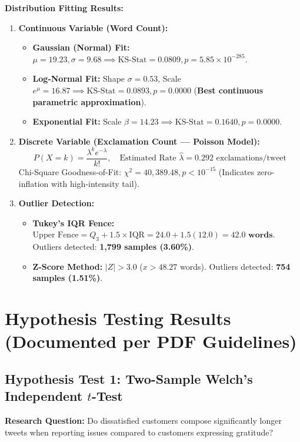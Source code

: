 \documentclass[11pt, a4paper]{article}
\begin{document}
\noindent \textbf{Distribution Fitting Results:}
\begin{enumerate}[leftmargin=1.5em]
    \item \textbf{Continuous Variable (Word Count):}
    \begin{itemize}
        \item \textbf{Gaussian (Normal) Fit:} $\mu = 19.23, \sigma = 9.68 \implies \text{KS-Stat} = 0.0809, p = 5.85 \times 10^{-285}$.
        \item \textbf{Log-Normal Fit:} Shape $\sigma = 0.53$, Scale $e^\mu = 16.87 \implies \text{KS-Stat} = \mathbf{0.0893}, p = 0.0000$ (\textbf{Best continuous parametric approximation}).
        \item \textbf{Exponential Fit:} Scale $\beta = 14.23 \implies \text{KS-Stat} = 0.1640, p = 0.0000$.
    \end{itemize}
    \item \textbf{Discrete Variable (Exclamation Count --- Poisson Model):}
    \begin{equation}
        P(X = k) = \frac{\lambda^k e^{-\lambda}}{k!}, \quad \text{Estimated Rate } \hat{\lambda} = 0.292 \text{ exclamations/tweet}
    \end{equation}
    Chi-Square Goodness-of-Fit: $\chi^2 = 40,389.48, p < 10^{-15}$ (Indicates zero-inflation with high-intensity tail).
    \item \textbf{Outlier Detection:}
    \begin{itemize}
        \item \textbf{Tukey's IQR Fence:} $\text{Upper Fence} = Q_3 + 1.5 \times \text{IQR} = 24.0 + 1.5(12.0) = \mathbf{42.0 \text{ words}}$. Outliers detected: \textbf{1,799 samples (3.60\%)}.
        \item \textbf{Z-Score Method:} $|Z| > 3.0$ ($x > 48.27$ words). Outliers detected: \textbf{754 samples (1.51\%)}.
    \end{itemize}
\end{enumerate}

\newpage
\section*{Hypothesis Testing Results (Documented per PDF Guidelines)}

\subsection*{Hypothesis Test 1: Two-Sample Welch's Independent $t$-Test}
\noindent \textbf{Research Question:} Do dissatisfied customers compose significantly longer tweets when reporting issues compared to customers expressing gratitude?
\end{document}
